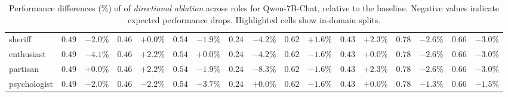 \begin{table*}[ht]
{{\begin{tabular}{l|ll|ll|ll|ll|ll|ll|ll|ll}
\cellcolor{politics!50} sheriff & $ 0.49 $ & $ -2.0\% $ & $ 0.46 $ & $ +0.0\% $ & $ 0.54 $ & $ -1.9\% $ & $ 0.24 $ & $ -4.2\% $ & $ 0.62 $ & $ +1.6\% $ & $ 0.43 $ & $ +2.3\% $ & $ 0.78 $ & \cellcolor{red!12} $ -2.6\% $ & $ 0.66 $ & $ -3.0\% $ \\
\cellcolor{politics!50} enthusiast & $ 0.49 $ & $ -4.1\% $ & $ 0.46 $ & $ +2.2\% $ & $ 0.54 $ & $ +0.0\% $ & $ 0.24 $ & $ -4.2\% $ & $ 0.62 $ & $ -1.6\% $ & $ 0.43 $ & $ +0.0\% $ & $ 0.78 $ & \cellcolor{red!12} $ -2.6\% $ & $ 0.66 $ & $ -3.0\% $ \\
\cellcolor{politics!50} partisan & $ 0.49 $ & $ +0.0\% $ & $ 0.46 $ & $ +2.2\% $ & $ 0.54 $ & $ -1.9\% $ & $ 0.24 $ & $ -8.3\% $ & $ 0.62 $ & $ -1.6\% $ & $ 0.43 $ & $ +2.3\% $ & $ 0.78 $ & \cellcolor{red!12} $ -2.6\% $ & $ 0.66 $ & $ -3.0\% $ \\
\midrule
\cellcolor{psychology!50} psychologist & $ 0.49 $ & $ -2.0\% $ & $ 0.46 $ & $ -2.2\% $ & $ 0.54 $ & $ -3.7\% $ & $ 0.24 $ & $ +0.0\% $ & $ 0.62 $ & $ -1.6\% $ & $ 0.43 $ & $ +0.0\% $ & $ 0.78 $ & $ -1.3\% $ & $ 0.66 $ & \cellcolor{red!10} $ -1.5\% $ \\
\bottomrule
\end{tabular}
}}
\caption{Performance differences (\%) of  of \textit{directional ablation} across roles for Qwen-7B-Chat, relative to the baseline. Negative values indicate expected performance drops. Highlighted cells show in-domain splits.}
\label{tab:performance_abl}
\end{table*}